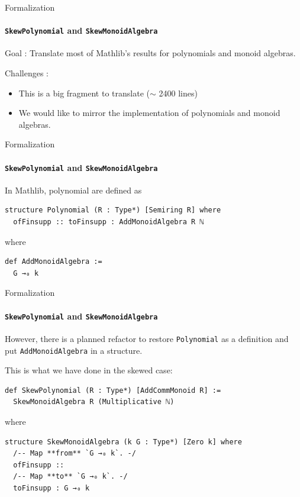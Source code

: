 \begin{frame}[fragile]{Formalization}
	\framesubtitle{\texttt{SkewPolynomial} and \texttt{SkewMonoidAlgebra}}

        Goal : Translate most of Mathlib's results for polynomials and monoid algebras.

        Challenges :
        \begin{itemize}
            \item This is a big fragment to translate ($\sim$ 2400 lines)
            \item We would like to mirror the implementation of polynomials and monoid algebras.
        \end{itemize}
\end{frame}

\begin{frame}[fragile]{Formalization}
	\framesubtitle{\texttt{SkewPolynomial} and \texttt{SkewMonoidAlgebra}}

        In Mathlib, polynomial are defined as
\begin{verbatim}
structure Polynomial (R : Type*) [Semiring R] where
  ofFinsupp :: toFinsupp : AddMonoidAlgebra R ℕ
\end{verbatim}
where 
\begin{verbatim}
def AddMonoidAlgebra :=
  G →₀ k
\end{verbatim}
    
\end{frame}

\begin{frame}[fragile]{Formalization}
	\framesubtitle{\texttt{SkewPolynomial} and \texttt{SkewMonoidAlgebra}}

However, there is a planned refactor to restore \texttt{Polynomial} as a definition and put \texttt{AddMonoidAlgebra} in a structure.

This is what we have done in the skewed case:
\begin{verbatim}
def SkewPolynomial (R : Type*) [AddCommMonoid R] :=
  SkewMonoidAlgebra R (Multiplicative ℕ)
\end{verbatim}
where 
\begin{verbatim}
structure SkewMonoidAlgebra (k G : Type*) [Zero k] where
  /-- Map **from** `G →₀ k`. -/
  ofFinsupp ::
  /-- Map **to** `G →₀ k`. -/
  toFinsupp : G →₀ k
\end{verbatim}
\end{frame}


